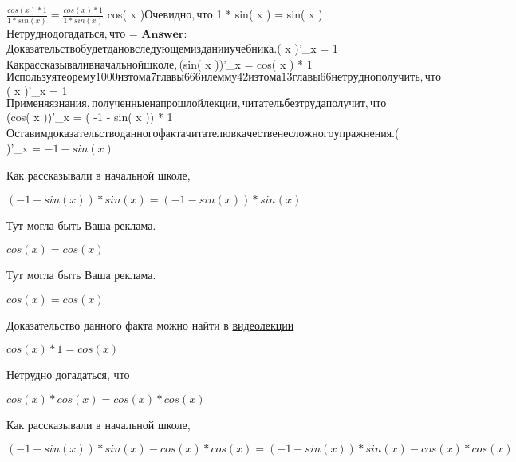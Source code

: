 \documentclass[12pt,a4paper,fleqn]{article}
\theoremstyle{definition}
\begin{document}
$\frac{cos( x ) *  1 }{ 1  * sin( x )}
 = \frac{cos( x ) *  1 }{ 1  * sin( x )}
$
cos( x )$

Очевидно, что 

$ 1  * sin( x ) = sin( x )$

Нетрудно догадаться, что 

$
 = 
$


\textbf{Answer:}

$
$

Доказательство будет дано в следующем издании учебника. 

$( x )'_{x} =  1 $

Как рассказывали в начальной школе, 

$(sin( x ))'_{x} = cos( x ) *  1 $

Используя теорему 1000 из тома 7 главы 666 и лемму 42 из тома 13 главы 66 нетрудно получить, что 

$( x )'_{x} =  1 $

Применяя знания, полученные на прошлой лекции, читатель без труда получит, что 

$(cos( x ))'_{x} = ( -1  - sin( x )) *  1 $

Оставим доказательство данного факта читателю в качестве несложного упражнения. 

$(
)'_{x} = 
$
 -1  - sin( x )$

Как рассказывали в начальной школе, 

$( -1  - sin( x )) * sin( x ) = ( -1  - sin( x )) * sin( x )$

Тут могла быть Ваша реклама. 

$cos( x ) = cos( x )$

Тут могла быть Ваша реклама. 

$cos( x ) = cos( x )$

Доказательство данного факта можно найти в \href{https://www.youtube.com/watch?v=dQw4w9WgXcQ}{видеолекции} 

$cos( x ) *  1  = cos( x )$

Нетрудно догадаться, что 

$cos( x ) * cos( x ) = cos( x ) * cos( x )$

Как рассказывали в начальной школе, 

$( -1  - sin( x )) * sin( x ) - cos( x ) * cos( x ) = ( -1  - sin( x )) * sin( x ) - cos( x ) * cos( x )$
\end{document}
